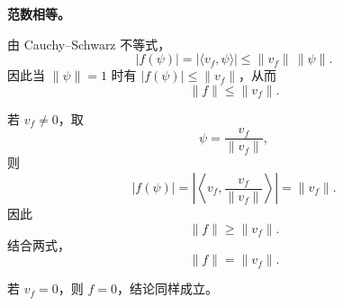 \documentclass[UTF8,a4paper,11pt,openany]{ctexbook}
\begin{document}
\begin{proofblock}
\medskip

\textbf{范数相等。}

由 Cauchy--Schwarz 不等式，
\[
|f(\psi)|
=
|\langle v_f,\psi\rangle|
\leq
\|v_f\|\,\|\psi\|.
\]
因此当 $\|\psi\|=1$ 时有 $|f(\psi)|\leq\|v_f\|$，从而
\begin{equation}
    \|f\|
    \leq
    \|v_f\|.
\end{equation}

若 $v_f\neq0$，取
\[
\psi
=
\frac{v_f}{\|v_f\|},
\]
则
\[
|f(\psi)|
=
\left|
\left\langle
v_f,
\frac{v_f}{\|v_f\|}
\right\rangle
\right|
=
\|v_f\|.
\]
因此
\[
\|f\|
\geq
\|v_f\|.
\]
结合两式，
\begin{equation}
    \boxed{
    \|f\|
    =
    \|v_f\|
    }.
\end{equation}

若 $v_f=0$，则 $f=0$，结论同样成立。
\end{proofblock}
\end{document}
